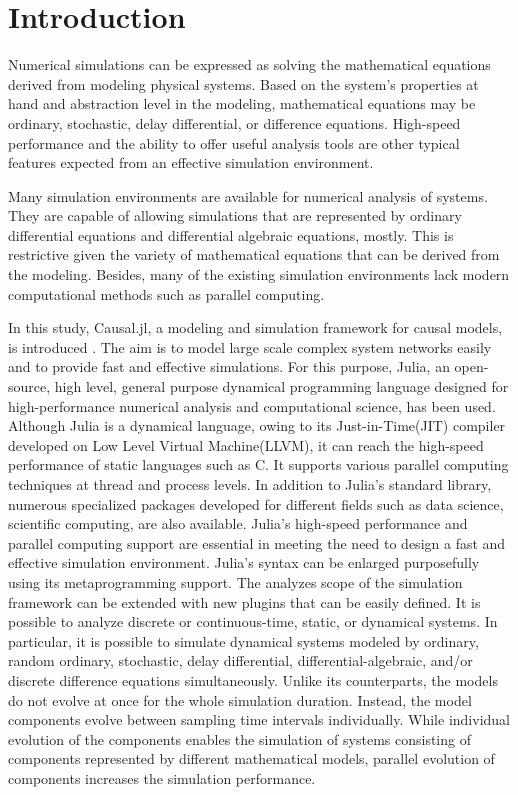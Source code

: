 \section{Introduction}
Numerical simulations can be expressed as solving the mathematical equations derived from modeling physical systems. Based on the system's properties at hand and abstraction level in the modeling, mathematical equations may be ordinary, stochastic, delay differential, or difference equations. High-speed performance and the ability to offer useful analysis tools are other typical features expected from an effective simulation environment.


Many simulation environments are available for numerical analysis of systems\cite{elmqvist1978structured,nytsch2006advanced,zimmer2008introducing,mosterman2002hybrsim,van2001variables,giorgidze2009higher,pfeiffer2012pysimulator,simulink}. They are capable of allowing simulations that are represented by ordinary differential equations and differential algebraic equations, mostly. This is restrictive given the variety of mathematical equations that can be derived from the modeling\cite{rackauckas2017differentialequations}. Besides, many of the existing simulation environments lack modern computational methods such as parallel computing.

In this study, Causal.jl, a modeling and simulation framework for causal models, is introduced \cite{causal}. The aim is to model large scale complex system networks easily and to provide fast and effective simulations. For this purpose, Julia, an open-source, high level, general purpose dynamical programming language designed for high-performance numerical analysis and computational science, has been used. Although Julia is a dynamical language, owing to its Just-in-Time(JIT) compiler developed on Low Level Virtual Machine(LLVM), it can reach the high-speed performance of static languages such as C\cite{bezanson2017julia,julialang}. It supports various parallel computing techniques at thread and process levels. In addition to Julia's standard library, numerous specialized packages developed for different fields such as data science, scientific computing, are also available. Julia's high-speed performance and parallel computing support are essential in meeting the need to design a  fast and effective simulation environment. Julia's syntax can be enlarged purposefully using its metaprogramming support. The analyzes scope of the simulation framework can be extended with new plugins that can be easily defined. It is possible to analyze discrete or continuous-time, static, or dynamical systems. In particular, it is possible to simulate dynamical systems modeled by ordinary, random ordinary, stochastic, delay differential, differential-algebraic, and/or discrete difference equations simultaneously. Unlike its counterparts, the models do not evolve at once for the whole simulation duration. Instead, the model components evolve between sampling time intervals individually. While individual evolution of the components enables the simulation of systems consisting of components represented by different mathematical models, parallel evolution of components increases the simulation performance.
